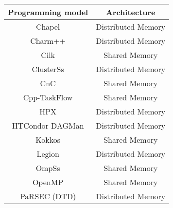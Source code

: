 \begin{tabular}{cc}
\hline
Programming model & Architecture \\
\hline
Chapel & Distributed Memory\\
Charm++ & Distributed Memory\\
Cilk & Shared Memory\\
ClusterSs & Distributed Memory\\
CnC & Shared Memory\\
Cpp-TaskFlow & Shared Memory\\
HPX & Distributed Memory\\
HTCondor DAGMan & Distributed Memory\\
Kokkos & Shared Memory\\
Legion & Distributed Memory\\
OmpSs & Shared Memory\\
OpenMP & Shared Memory\\
PaRSEC (DTD) & Distributed Memory\\
\hline
\end{tabular}
